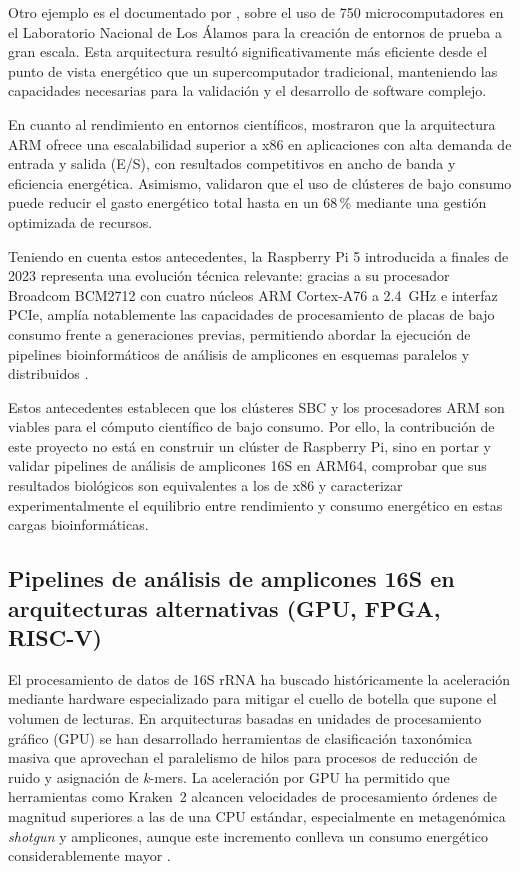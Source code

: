 \documentclass[12pt,oneside,spanish]{book}
\begin{document}
    Otro ejemplo es el documentado por \citet{miller2017}, sobre el uso de 750 microcomputadores en el Laboratorio Nacional de Los Álamos para la creación de entornos de prueba a gran escala. Esta arquitectura resultó significativamente más eficiente desde el punto de vista energético que un supercomputador tradicional, manteniendo las capacidades necesarias para la validación y el desarrollo de software complejo.
    
    En cuanto al rendimiento en entornos científicos, \citet{maqbool2015arm} mostraron que la arquitectura ARM ofrece una escalabilidad superior a x86 en aplicaciones con alta demanda de entrada y salida (E/S), con resultados competitivos en ancho de banda y eficiencia energética. Asimismo, \citet{warade2022} validaron que el uso de clústeres de bajo consumo puede reducir el gasto energético total hasta en un 68\,\% mediante una gestión optimizada de recursos.
    \newpage
    
    Teniendo en cuenta estos antecedentes, la Raspberry Pi 5 introducida a finales de 2023 representa una evolución técnica relevante: gracias a su procesador Broadcom BCM2712 con cuatro núcleos ARM Cortex-A76 a 2.4~GHz e interfaz PCIe, amplía notablemente las capacidades de procesamiento de placas de bajo consumo frente a generaciones previas, permitiendo abordar la ejecución de pipelines bioinformáticos de análisis de amplicones en esquemas paralelos y distribuidos \citep{rpi2023brief}.

    Estos antecedentes establecen que los clústeres SBC y los procesadores ARM son viables para el cómputo científico de bajo consumo. Por ello, la contribución de este proyecto no está en construir un clúster de Raspberry Pi, sino en portar y validar pipelines de análisis de amplicones 16S en ARM64, comprobar que sus resultados biológicos son equivalentes a los de x86 y caracterizar experimentalmente el equilibrio entre rendimiento y consumo energético en estas cargas bioinformáticas.
    
    \subsection{Pipelines de análisis de amplicones 16S en arquitecturas alternativas (GPU, FPGA, RISC-V)}
    
    El procesamiento de datos de 16S rRNA ha buscado históricamente la aceleración mediante hardware especializado para mitigar el cuello de botella que supone el volumen de lecturas. En arquitecturas basadas en unidades de procesamiento gráfico (GPU) se han desarrollado herramientas de clasificación taxonómica masiva que aprovechan el paralelismo de hilos para procesos de reducción de ruido y asignación de \textit{k}-mers. La aceleración por GPU ha permitido que herramientas como Kraken~2 alcancen velocidades de procesamiento órdenes de magnitud superiores a las de una CPU estándar, especialmente en metagenómica \textit{shotgun} y amplicones, aunque este incremento conlleva un consumo energético considerablemente mayor \citep{wood2019kraken2, robinson2021hardware}.
    
\end{document}

